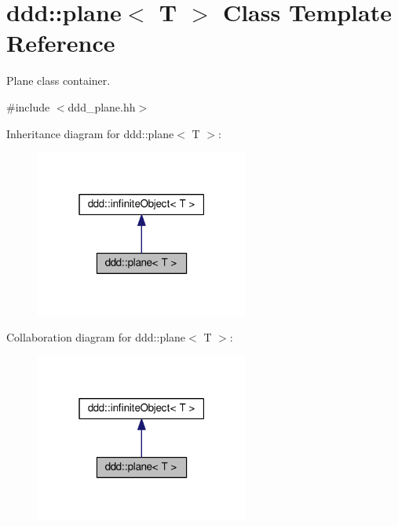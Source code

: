 \hypertarget{classddd_1_1plane}{}\section{ddd\+:\+:plane$<$ T $>$ Class Template Reference}
\label{classddd_1_1plane}


Plane class container.  




{\ttfamily \#include $<$ddd\+\_\+plane.\+hh$>$}



Inheritance diagram for ddd\+:\+:plane$<$ T $>$\+:\nopagebreak
\begin{figure}[H]
\begin{center}
\leavevmode
\includegraphics[width=199pt]{dd/d92/classddd_1_1plane__inherit__graph}
\end{center}
\end{figure}


Collaboration diagram for ddd\+:\+:plane$<$ T $>$\+:\nopagebreak
\begin{figure}[H]
\begin{center}
\leavevmode
\includegraphics[width=199pt]{da/d7d/classddd_1_1plane__coll__graph}
\end{center}
\end{figure}

